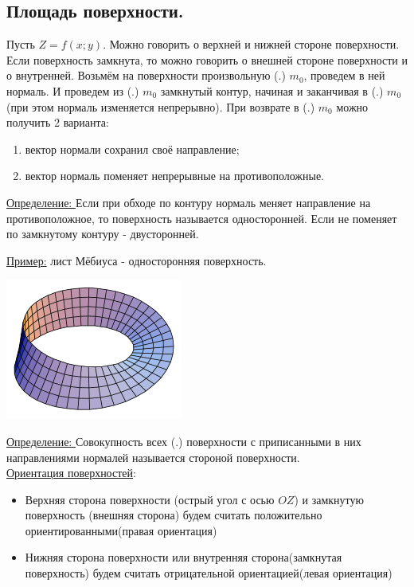 \documentclass[12pt]{article}
\let\ORIincludegraphics\includegraphics
\renewcommand{\includegraphics}[2][]{\ORIincludegraphics[scale=0.65,#1]{#2}}
\begin{document}
  \subsection{Площадь поверхности.}
  Пусть $Z=f(x;y)$. Можно говорить о верхней и нижней стороне поверхности. Если поверхность замкнута,
  то можно говорить о внешней стороне поверхности и о внутренней. Возьмём на поверхности произвольную
  (.) $m_0$, проведем в ней нормаль. И проведем из (.) $m_0$ замкнутый контур, начиная и заканчивая 
  в (.) $m_0$(при этом нормаль изменяется непрерывно). При возврате в (.) $m_0$ можно получить 2 
  варианта: 
  \begin{enumerate}
    \item вектор нормали сохранил своё направление;
    \item вектор нормаль поменяет непрерывные на противоположные.
  \end{enumerate}
  \underline{Определение: } Если при обходе по контуру нормаль меняет направление на противоположное,
  то поверхность называется односторонней. Если не поменяет по замкнутому контуру - двусторонней.\\
  \begin{minipage}{0.54\textwidth}
    \underline{Пример:} лист Мёбиуса - односторонняя поверхность. 
  \end{minipage}
  \hspace{1em}
  \begin{minipage}{0.3\textwidth}
    \includegraphics[scale=1]{8.18.1.png}
  \end{minipage}
  \vspace{1em}
  \par
  \underline{Определение: } Совокупность всех (.) поверхности с приписанными в них направлениями 
  нормалей называется стороной поверхности.\\
  \underline{Ориентация поверхностей}: 
  \begin{itemize}
    \item Верхняя сторона поверхности (острый угол с осью $OZ$) и замкнутую поверхность (внешняя сторона) 
    будем считать положительно ориентированными(правая ориентация)
    \item Нижняя сторона поверхности или внутренняя сторона(замкнутая поверхность) будем считать
    отрицательной ориентацией(левая ориентация)
  \end{itemize}
\end{document}
